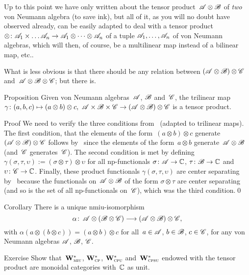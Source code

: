 \documentclass[a]{subfiles}
\begin{document}
\begin{parsec}%
\begin{point}%
Up to this point
we have only written about the tensor product~$\mathscr{A}\otimes \mathscr{B}$
of \emph{two} von Neumann algebra
(to save ink),
but all of it,
as you will no doubt have observed already,
can be easily adapted 
to deal with
a tensor product
$\otimes\colon \mathscr{A}_1\times\dotsc\mathscr{A}_n
\to\mathscr{A}_1\otimes \dotsb\otimes \mathscr{A}_n$
of a tuple $\mathscr{A}_1,\dotsc,\mathscr{A}_n$ of von Neumann algebras,
which will then, of course, be a multilinear map
instead of a bilinear map, etc..

What is less obvious
is that there should be any relation
between 
$(\mathscr{A}\otimes\mathscr{B})\otimes \mathscr{C}$
and~$\mathscr{A}\otimes\mathscr{B}\otimes\mathscr{C}$;
but there is.
\end{point}
\begin{point}{Proposition}%
Given von Neumann algebras~$\mathscr{A}$, $\mathscr{B}$ and~$\mathscr{C}$,
the trilinear map $\gamma\colon (a,b,c)\mapsto (a\otimes b)\otimes c,\ 
\scrA\times\scrB\times\scrC \to (\scrA\otimes \scrB)\otimes\scrC$
is a tensor product.
\begin{point}{Proof}%
We need to verify the three conditions
from~ (adapted
to trilinear maps).
The first condition,
that the elements of the form~$(a\otimes b)\otimes c$
generate $(\mathscr{A}\otimes \mathscr{B})\otimes \mathscr{C}$
follows
by~
since
the elements of the form~$a\otimes b$
generate~$\mathscr{A}\otimes \mathscr{B}$
(and~$\mathscr{C}$ generates~$\mathscr{C}$).
The second condition
is met by defining
$\gamma(\sigma,\tau,\upsilon):= (\sigma\otimes\tau)\otimes\upsilon$
for all np-functionals
$\sigma\colon \mathscr{A}\to\mathbb{C}$,
$\tau\colon \mathscr{B} \to\mathbb{C}$
and~$\upsilon\colon \mathscr{C}\to\mathbb{C}$.
Finally,
these product functionals
$\gamma(\sigma,\tau,\upsilon)$
are center separating by~
because
the functionals on~$\mathscr{A}\otimes \mathscr{B}$
of the form $\sigma\otimes\tau$
are center separating (and so is
the set of all np-functionals on~$\mathscr{C}$),
which was the third condition.\qed
\end{point}
\end{point}
\begin{point}{Corollary}%
There is a unique nmiu-isomorphism
\begin{equation*}
		\alpha\colon \, \mathscr{A}\otimes(\mathscr{B}\otimes \mathscr{C})
\longrightarrow  (\mathscr{A} \otimes \mathscr{B})\otimes\mathscr{C},
\end{equation*}
with $\alpha(a\otimes(b\otimes c))=(a\otimes b)\otimes c$
for all~$a\in\mathscr{A}$, $b\in\mathscr{B}$, $c\in\mathscr{C}$,
for any von Neumann algebras
$\mathscr{A}$, $\mathscr{B}$, $\mathscr{C}$.
\end{point}
\begin{point}{Exercise}%
Show that~$\mathbf{W}^*_{\text{\textsc{miu}}}$, $\mathbf{W}^*_{\text{\textsc{cp}}}$, $\mathbf{W}^*_{\text{\textsc{cpu}}}$
and~$\mathbf{W}^*_{\text{\textsc{cpsu}}}$ endowed with the tensor product
are monoidal categories with~$\mathbb{C}$ as unit.
\end{point}
\end{parsec}
\end{document}
